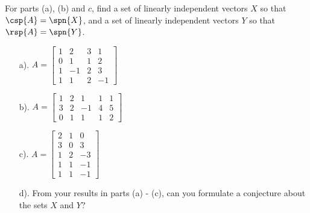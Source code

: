For parts (a), (b) and $c$, find a set of linearly independent vectors $X$ so that $\csp{A} = \spn{X}$, and a set of linearly independent vectors $Y$ so that $\rsp{A} = \spn{Y}$.
\begin{enumerate}
\item[a).] $A = \begin{bmatrix} 1 & 2 & 3 & 1 \\ 0 & 1 & 1 & 2\\ 1 & -1 & 2 & 3 \\ 1 & 1 & 2 & -1 \end{bmatrix}$
\item[b).] $A = \begin{bmatrix}  1 & 2 & 1 & 1 & 1 \\ 3 & 2 & -1 & 4 & 5\\ 0 & 1 & 1 & 1 & 2 \end{bmatrix}$
\item[c).] $A = \begin{bmatrix}  2 & 1 & 0 \\ 3 & 0 & 3\\ 1 & 2 & -3 \\ 1 & 1 & -1 \\ 1 & 1 & -1\end{bmatrix}$
\item[d).] From your results in parts (a) - (c), can you formulate a conjecture about the sets $X$ and $Y$?
\end{enumerate}